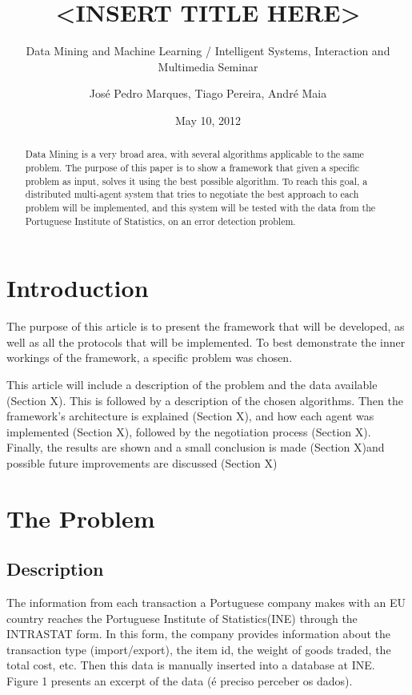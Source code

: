 \documentclass{llncs}
\begin{document}
\title{<INSERT TITLE HERE>}
\subtitle{Data Mining and Machine Learning / Intelligent Systems, Interaction and Multimedia Seminar}
\author{Jos\'e Pedro Marques, Tiago Pereira, André Maia}
\date{May 10, 2012}
\maketitle

\begin{abstract}
Data Mining is a very broad area, with several algorithms applicable to the same problem. The purpose of this paper is to show a framework that given a specific problem as input, solves it using the best possible algorithm. To reach this goal, a distributed multi-agent system that
tries to negotiate the best approach to each problem will be implemented, and this system will be tested with the data from the Portuguese Institute of Statistics, on an error detection problem.
\end{abstract}

\section{Introduction}

The purpose of this article is to present the framework that will be
developed, as well as all the protocols that will be implemented. To best demonstrate the inner workings of the framework, a specific problem
was chosen.

This article will include a description of the problem and the data available (Section X). This is followed by a description of the chosen algorithms. Then the framework's architecture is explained (Section X), and how each agent was implemented (Section X), followed by the negotiation process (Section X). Finally, the results are shown and a small conclusion is made (Section X)and possible future improvements are discussed (Section X)


\section{The Problem}


\subsection{Description}

The information from each transaction a Portuguese company makes with an EU country reaches the Portuguese Institute of Statistics(INE) through the INTRASTAT form. In this form, the company provides information  about the transaction type (import/export), the item id, the weight of goods traded, the total cost, etc. Then this data is manually inserted into a database at INE. Figure 1 presents an excerpt of the data (é preciso perceber os dados).
\end{document}

